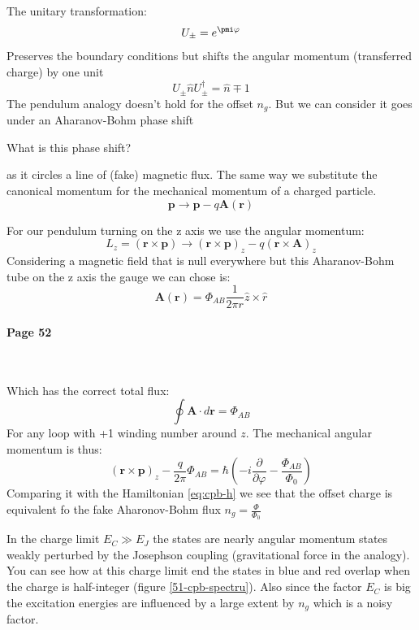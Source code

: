 \documentclass[12pt]{article}
\numberwithin{equation}{subsection}
\newcommand\ask[1]{
{\color{red}
#1
}
}
\newcommand\page[1]{
{
\color{blue}\paragraph{
Page #1
}\mbox{}\\
}
}
\begin{document}
The unitary transformation:
\begin{equation}
    U_\pm = e^{\pmi\varphi}
\end{equation}
Preserves the boundary conditions but shifts the angular momentum (transferred charge) by one unit
\begin{equation}
    U_\pm\hat nU_\pm^\dagger = \hat n \mp 1
\end{equation}
The pendulum analogy doesn't hold for the offset $n_g$. But we can consider it goes under an Aharanov-Bohm phase shift
\ask{What is this phase shift?}
as it circles a line of (fake) magnetic flux. The same way we substitute the canonical momentum for the mechanical momentum of a charged particle.
\begin{equation}
    \mathbf p \rightarrow \mathbf p - q\mathbf A(\mathbf r)
\end{equation}

For our pendulum turning on the z axis we use the angular momentum:
\begin{equation}
    L_z = (\mathbf r \times \mathbf p) \rightarrow  (\mathbf r \times \mathbf p)_z - q (\mathbf r \times \mathbf A)_z
\end{equation}
Considering a magnetic field that is null everywhere but this Aharanov-Bohm tube on the z axis the gauge we can chose is:
\begin{equation}
    \mathbf A(\mathbf r)  = \Phi_{AB} \frac{1}{2\pi r} \hat z \times \hat r
\end{equation}
\page{52}
Which has the correct total flux:
\begin{equation}
    \oint \mathbf A \cdot d\mathbf r = \Phi_{AB}
\end{equation}
For any loop with +1 winding number around $z$. The mechanical angular momentum is thus:
\begin{equation}
     (\mathbf r \times \mathbf p)_z -\frac{q}{2\pi}\Phi_{AB}  = \hbar \left( -i\frac{\partial}{\partial \varphi} - \frac{\Phi_{AB}}{\Phi_0}\right )
\end{equation}
Comparing it with the Hamiltonian \ref{eq:cpb-h} we see that the offset charge is equivalent fo the fake Aharonov-Bohm flux $n_g = \frac{\Phi}{\Phi_0}$

In the charge limit $E_C \gg E_J$ the states are nearly angular momentum states weakly perturbed by the Josephson coupling (gravitational force in the analogy). You can see how at this charge limit end the states in blue and red overlap when the charge is half-integer (figure \ref{51-cpb-spectru}). Also since the factor $E_C$ is big the excitation energies are influenced by a large extent by $n_g$ which is a noisy factor.
\end{document}
